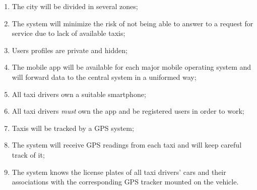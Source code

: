 \begin{enumerate}
\item The city will be divided in several zones;
\item The system will minimize the risk of not being able to answer to a request for service due to lack of available taxis;
\item Users profiles are private and hidden;
\item The mobile app will be available for each major mobile operating system and will forward data to the central system in a uniformed way;
\item All taxi drivers own a suitable smartphone;
\item All taxi drivers \emph{must} own the \mts{} app and be registered users in order to work;
\item Taxis will be tracked by a GPS system;
\item The system will receive GPS readings from each taxi and will keep careful track of it;
\item The system knows the license plates of all taxi drivers' cars and their associations with the corresponding GPS tracker mounted on the vehicle.
\end{enumerate}